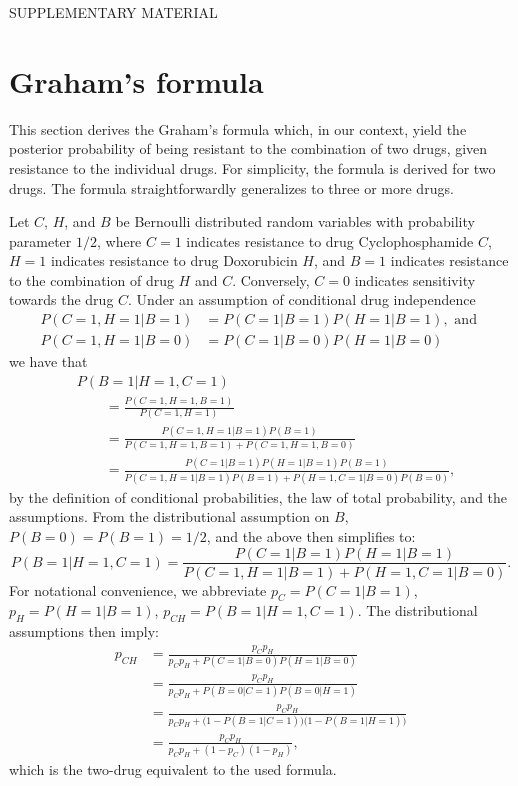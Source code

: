 % 
% 

{}
\begin{center}
{\huge SUPPLEMENTARY MATERIAL}\bigskip \\
{\bf \hemaClassTitle{}}
\end{center}

\section{Graham's formula}
This section derives the Graham's formula which, in our context, yield the posterior probability of being resistant to the combination of two drugs, given resistance to the individual drugs.
For simplicity, the formula is derived for two drugs.
The formula straightforwardly generalizes to three or more drugs.

Let $C$, $H$, and $B$ be Bernoulli distributed random variables with probability parameter $1/2$, where
$C = 1$ indicates resistance to drug Cyclophosphamide $C$,
$H = 1$ indicates resistance to drug Doxorubicin $H$, and
$B = 1$ indicates resistance to the combination of drug $H$ and $C$.
Conversely, $C = 0$ indicates sensitivity towards the drug $C$.
Under an assumption of conditional drug independence
\begin{align*}
  P(C=1, H=1| B=1) &= P(C=1 | B=1) P(H=1 | B=1), \text{ and } \\
  P(C=1, H=1| B=0) &= P(C=1 | B=0) P(H=1 | B=0)
\end{align*}
we have that
\begin{align*}
  &P(B=1 | H=1, C=1)
  \\&\qquad
   = \frac{P(C=1, H=1, B=1)}
          {P(C=1, H=1)}
  \\&\qquad
   = \frac{P(C=1, H=1 | B=1) P(B=1)}
          {P(C=1, H=1, B=1) + P(C=1, H=1, B=0)}
  \\&\qquad
   = \frac{P(C=1 | B=1) P(H=1 | B=1) P(B=1)}
          {P(C=1, H=1 | B=1) P(B=1) + P(H=1, C=1| B=0) P(B=0)},
\end{align*}
by the definition of conditional probabilities, the law of total probability, and the assumptions.
From the distributional assumption on $B$, $P(B=0) = P(B=1) = 1/2$, and the above then simplifies to:
\begin{equation*}
  P(B=1 | H=1, C=1)
   = \frac{P(C=1 | B=1) P(H=1 | B=1)}
          {P(C=1, H=1 | B=1) + P(H=1, C=1 | B=0)}.
\end{equation*}
For notational convenience, we abbreviate
$p_C = P(C=1 | B=1)$,
$p_H = P(H=1 | B=1)$,
$p_{CH} = P(B=1 | H=1, C=1)$.
The distributional assumptions then imply:
\begin{align*}
  p_{CH}
  &= \frac{p_C p_H}
          {p_C p_H + P(C=1 | B=0) P(H=1 | B=0)}
  \\
  &= \frac{p_C p_H}
          {p_C p_H + P(B=0 | C=1) P(B=0 | H=1)}
  \\
  &= \frac{p_C p_H}
          {p_C p_H + \bigl(1 - P(B=1 | C=1)\bigr)\bigl(1 - P(B=1 | H=1)\bigr)}
  \\
  &= \frac{p_C p_H}
          {p_C p_H + (1 - p_C)(1 - p_H)},
\end{align*}
which is the two-drug equivalent to the used formula.

% 